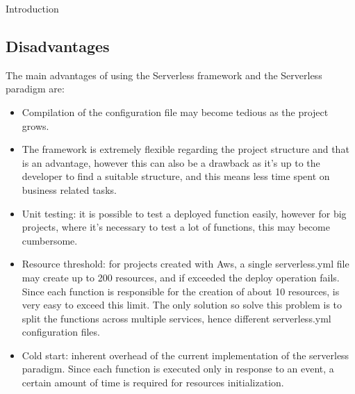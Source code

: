 \begin{chapter}{Introduction}
    \subsection{Disadvantages}
    The main advantages of using the Serverless framework and the Serverless paradigm are:
    \begin{itemize}
        \item Compilation of the configuration file may become tedious as the project grows.
        \item The framework is extremely flexible regarding the project structure and
            that is an advantage, however this can also be a drawback as it's up to the
            developer to find a suitable structure, and this means less time spent on
            business related tasks.
        \item Unit testing: it is possible to test a deployed function easily, however
            for big projects, where it's necessary to test a lot of functions, this may
            become cumbersome.
        \item Resource threshold: for projects created with Aws, a single
            serverless.yml file may create up to 200 resources, and if exceeded
            the deploy operation fails. Since each function is responsible for the
            creation of about 10 resources, is very easy to exceed this limit.
            The only solution so solve this problem is to split the functions across
            multiple services, hence different serverless.yml configuration files.
        \item Cold start: inherent overhead of the current implementation of the
            serverless paradigm. Since each function is executed only in response to
            an event, a certain amount of time is required for resources initialization.
    \end{itemize}


\end{chapter}
